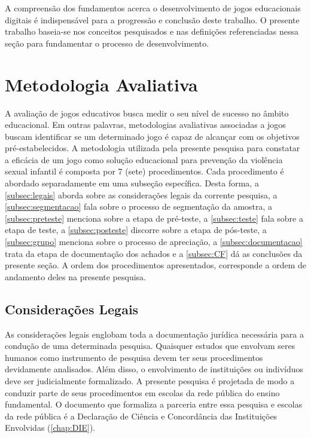 A compreensão dos fundamentos acerca o desenvolvimento de jogos educacionais digitais é indispensável para a progressão e conclusão deste trabalho. O presente trabalho baseia-se nos conceitos pesquisados e nas definições referenciadas nessa seção para fundamentar o processo de desenvolvimento.


\section{Metodologia Avaliativa}\label{sec:Avaliativos}

A avaliação de jogos educativos busca medir o seu nível de sucesso no âmbito educacional. Em outras palavras, metodologias avaliativas associadas a jogos buscam identificar se um determinado jogo é capaz de alcançar com os objetivos pré-estabelecidos. A metodologia utilizada pela presente pesquisa para constatar a eficácia de um jogo como solução educacional para prevenção da violência sexual infantil é composta por 7 (sete) procedimentos. Cada procedimento é abordado separadamente em uma subseção específica. Desta forma, a \autoref{subsec:legais} aborda sobre as considerações legais da corrente pesquisa, a \autoref{subsec:segmentacao} fala sobre o processo de segmentação da amostra, a \autoref{subsec:preteste} menciona sobre a etapa de pré-teste, a \autoref{subsec:teste} fala sobre a etapa de teste, a \autoref{subsec:posteste} discorre sobre a etapa de pós-teste, a \autoref{subsec:grupo} menciona sobre o processo de apreciação, a \autoref{subsec:documentacao} trata da etapa de documentação dos achados e a \autoref{subsec:CF} dá as conclusões da presente seção. A ordem dos procedimentos apresentados, corresponde a ordem de andamento deles na presente pesquisa. 

\subsection{Considerações Legais}\label{subsec:legais}

As considerações legais englobam toda a documentação jurídica necessária para a condução de uma determinada pesquisa. Quaisquer estudos que envolvam seres humanos como instrumento de pesquisa devem ter seus procedimentos devidamente analisados. Além disso, o envolvimento de instituições ou indivíduos deve ser judicialmente formalizado. A presente pesquisa é projetada de modo a conduzir parte de seus procedimentos em escolas da rede pública do ensino fundamental. O documento que formaliza a parceria entre essa pesquisa e escolas da rede pública é a Declaração de Ciência e Concordância das Instituições Envolvidas (\autoref{chap:DIE}). 

